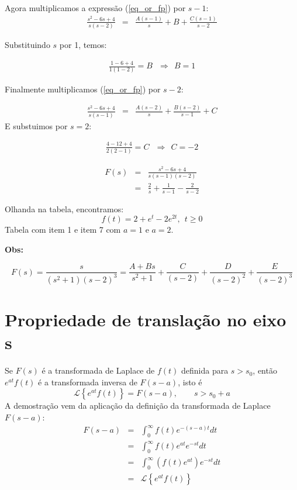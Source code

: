 \documentclass[a4paper,10pt]{book}
\begin{document}
 
Agora multiplicamos a expressão (\ref{eq_or_fp}) por $s-1$:
% 
 \begin{eqnarray*}\frac{s^2-6s+4}{s(s-2)}
 &=&\frac{A(s-1)}{s}+{B}+\frac{C(s-1)}{s-2}
 \end{eqnarray*}

 Substituindo $s$ por 1, temos:

  \begin{eqnarray*}\frac{1-6+4}{1(1-2)}
 =B~~~\Longrightarrow ~~B = 1
 \end{eqnarray*}

 Finalmente multiplicamos (\ref{eq_or_fp}) por $s-2$:
 
 \begin{eqnarray*}\frac{s^2-6s+4}{s(s-1)}
 &=&\frac{A(s-2)}{s}+\frac{B(s-2)}{s-1}+{C}
 \end{eqnarray*}
E substuimos por $s=2$:

 \begin{eqnarray*}\frac{4-12+4}{2(2-1)}
 ={C}~~~\Longrightarrow ~~C = -2
 \end{eqnarray*}

 
 \begin{eqnarray}F(s)&=&\frac{s^2-6s+4}{s(s-1)(s-2)}\\
 &=&\frac{2}{s}+\frac{1}{s-1}-\frac{2}{s-2}
 \end{eqnarray}
 
 Olhanda na tabela, encontramos:
 $$f(t)=2+e^t-2e^{2t},~~t\geq 0$$
 Tabela com item 1 e item 7 com $a=1$ e $a=2$.
 
 {\bf Obs:}
 
 $$F(s)=\frac{s}{(s^2+1)(s-2)^3}=\frac{A+Bs}{s^2+1}+\frac{C}{(s-2)}+\frac{D}{(s-2)^2}+\frac{E}{(s-2)^3}$$
  \section{Propriedade de translação no eixo s}
% 
  Se $F(s)$ é a transformada de Laplace de $f(t)$ definida para $s>s_0$, então $e^{at}f(t)$ é a transformada inversa de $F(s-a)$, isto é
  \begin{equation*}
  \mathcal{L}\left\{e^{at}f(t)\right\} =F(s-a),\qquad s>s_0+a
  \end{equation*}
  A demostração vem da aplicação da definição da transformada de Laplace $F(s-a)$:
 \begin{eqnarray*}
   F(s-a)&=&\int_0^\infty f(t)e^{-(s-a)t}dt\\
  &=&\int_0^\infty f(t)e^{at}e^{-st}dt\\
&=&\int_0^\infty \left(f(t)e^{at}\right)e^{-st}dt\\
    &=&\mathcal{L}\left\{e^{at}f(t)\right\}
   \end{eqnarray*}
\end{document}

